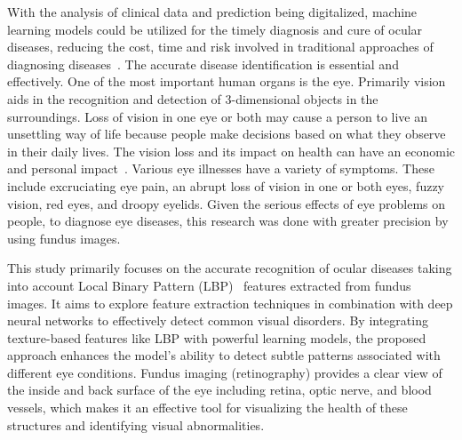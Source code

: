 \documentclass{ijclclp}
\begin{document}
With the analysis of clinical data and prediction being digitalized, machine learning models could be utilized for the timely diagnosis and cure of ocular diseases, reducing the cost, time and risk involved in traditional approaches of diagnosing diseases~\cite{xu2023automatic, du2024recognition}. The accurate disease identification is essential and effectively. One of
the most important human organs is the eye. Primarily vision
aids in the recognition and detection of 3-dimensional objects in the surroundings. Loss of vision in one eye or both may cause a person to live an
unsettling way of life because people make decisions based
on what they observe in their daily lives. The vision loss and its impact on health can have an economic and personal impact~\cite{armstrong2014eye}.
Various eye illnesses have a variety of symptoms.
These include excruciating eye pain, an abrupt loss of vision
in one or both eyes, fuzzy vision, red eyes, and droopy
eyelids. Given the serious effects of eye problems on people,
to diagnose eye diseases, this research was done with
greater precision by using fundus images. 

This study primarily focuses on the accurate recognition of ocular diseases taking into account Local Binary Pattern (LBP)~\cite{halapathirana2023lbp} features extracted from fundus images. It aims to explore feature extraction techniques in combination with deep neural networks to effectively detect common visual disorders. By integrating texture-based features like LBP with powerful learning models, the proposed approach enhances the model’s ability to detect subtle patterns associated with different eye conditions. Fundus imaging (retinography) provides a clear view of the inside and back surface of the eye including retina, optic nerve, and blood vessels, which makes it an effective tool for visualizing the health of these structures and identifying visual abnormalities. 
\end{document}
